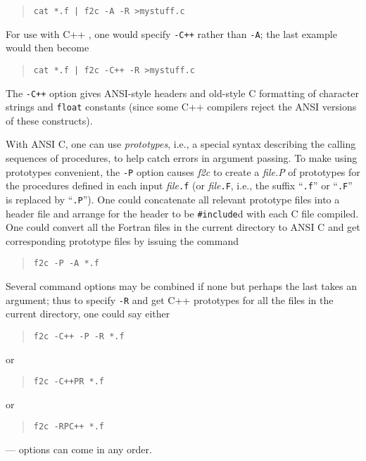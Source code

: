 \documentclass[10pt,a4paper]{article}
\begin{document}
\begin{quote}
\begin{verbatim}
cat *.f | f2c -A -R >mystuff.c
\end{verbatim}
\end{quote}
For use with C++ \citep{15}, one would specify \verb|-C++| rather than \verb|-A|; the last example would then become
\begin{quote}
\begin{verbatim}
cat *.f | f2c -C++ -R >mystuff.c
\end{verbatim}
\end{quote}
The \verb|-C++| option gives ANSI-style headers and old-style C formatting of character strings and \verb|float| constants (since some C++ compilers reject the ANSI versions of these constructs).

\noindent
With ANSI C, one can use \emph{prototypes}, i.e., a special syntax describing the calling sequences of procedures, to help catch errors in argument passing. To make using prototypes convenient, the \verb|-P| option causes \emph{f2c} to create a \emph{file.P} of prototypes for the procedures defined in each input \emph{file}\verb|.f| (or \emph{file}\verb|.F|, i.e., the suffix ``\verb|.f|'' or ``\verb|.F|'' is replaced by ``\verb|.P|''). One could concatenate all relevant prototype files into a header file and arrange for the header to be \verb|#include|d with each C file compiled. One could convert all the Fortran files in the current directory to ANSI C and get corresponding prototype files by issuing the command
\begin{quote}
\begin{verbatim}
f2c -P -A *.f
\end{verbatim}
\end{quote}
Several command options may be combined if none but perhaps the last takes an argument; thus to specify \verb|-R| and get C++ prototypes for all the files in the current directory, one could say either
\begin{quote}
\begin{verbatim}
f2c -C++ -P -R *.f
\end{verbatim}
\end{quote}
or
\begin{quote}
\begin{verbatim}
f2c -C++PR *.f
\end{verbatim}
\end{quote}
or
\begin{quote}
\begin{verbatim}
f2c -RPC++ *.f
\end{verbatim}
\end{quote}
--- options can come in any order.
\end{document}
